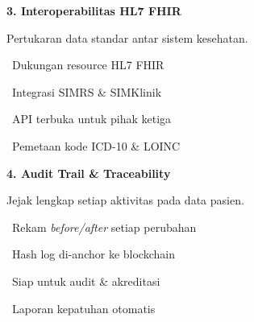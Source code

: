 \documentclass[a4paper]{article}
\begin{document}
\vspace{8pt}

\noindent
\begin{minipage}[t]{0.485\textwidth}
    \colorbox{PurplePrimary}{%
        \begin{minipage}{\dimexpr\textwidth-2\fboxsep\relax}
            {\fontsize{10}{13}\selectfont\bfseries\color{White} 3. Interoperabilitas HL7 FHIR}
        \end{minipage}}\par
    \vspace{4pt}
    {\fontsize{9}{12}\selectfont\color{TextDark}%
    Pertukaran data standar antar sistem kesehatan.\par\vspace{3pt}
    \textbullet\ Dukungan resource HL7 FHIR\par\vspace{2pt}%
    \textbullet\ Integrasi SIMRS \& SIMKlinik\par\vspace{2pt}%
    \textbullet\ API terbuka untuk pihak ketiga\par\vspace{2pt}%
    \textbullet\ Pemetaan kode ICD-10 \& LOINC}%
\end{minipage}%
\hfill
\begin{minipage}[t]{0.485\textwidth}
    \colorbox{BlueDark}{%
        \begin{minipage}{\dimexpr\textwidth-2\fboxsep\relax}
            {\fontsize{10}{13}\selectfont\bfseries\color{White} 4. Audit Trail \& Traceability}
        \end{minipage}}\par
    \vspace{4pt}
    {\fontsize{9}{12}\selectfont\color{TextDark}%
    Jejak lengkap setiap aktivitas pada data pasien.\par\vspace{3pt}
    \textbullet\ Rekam \textit{before/after} setiap perubahan\par\vspace{2pt}%
    \textbullet\ Hash log di-anchor ke blockchain\par\vspace{2pt}%
    \textbullet\ Siap untuk audit \& akreditasi\par\vspace{2pt}%
    \textbullet\ Laporan kepatuhan otomatis}%
\end{minipage}
\end{document}

